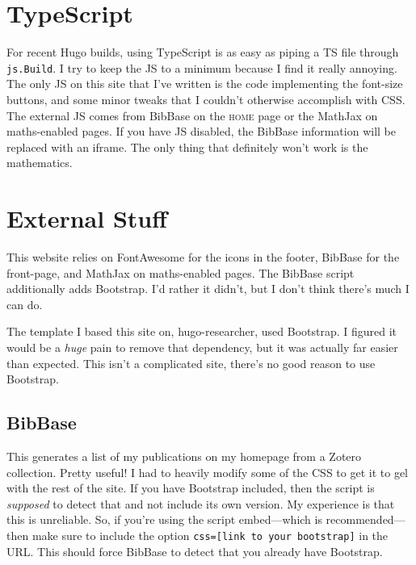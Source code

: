 \documentclass[a4paper,11pt,oneside,article]{memoir}
\begin{document}
\chapter[TypeScript]{TypeScript}

For recent Hugo builds, using TypeScript is as easy as piping a TS file through \texttt{js.Build}. I try to keep the JS to a minimum because I find it really annoying. The only JS on this site that I've written is the code implementing the font-size buttons, and some minor tweaks that I couldn't otherwise accomplish with CSS. The external JS comes from BibBase on the \textsc{home} page or the MathJax on maths-enabled pages. If you have JS disabled, the BibBase information will be replaced with an iframe. The only thing that definitely won't work is the mathematics.

\chapter[External Stuff]{External Stuff}

This website relies on FontAwesome for the icons in the footer, BibBase for the front-page, and MathJax on maths-enabled pages. The BibBase script additionally adds Bootstrap. I'd rather it didn't, but I don't think there's much I can do.

The template I based this site on, hugo-researcher, used Bootstrap. I figured it would be a \emph{huge} pain to remove that dependency, but it was actually far easier than expected. This isn't a complicated site, there's no good reason to use Bootstrap.

\section{BibBase}

This generates a list of my publications on my homepage from a Zotero collection. Pretty useful! I had to heavily modify some of the CSS to get it to gel with the rest of the site.  If you have Bootstrap included, then the script is \emph{supposed} to detect that and not include its own version. My experience is that this is unreliable. So, if you're using the script embed—which is recommended—then make sure to include the option \texttt{css=[link to your bootstrap]} in the URL. This should force BibBase to detect that you already have Bootstrap.
\end{document}
